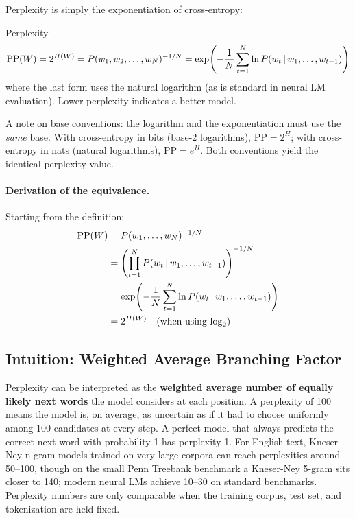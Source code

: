 Perplexity is simply the exponentiation of cross-entropy:

\begin{mathresult}{Perplexity}
\begin{equation}
\text{PP}(W) = 2^{H(W)}
= P(w_1, w_2, \ldots, w_N)^{-1/N}
= \exp\!\left(-\frac{1}{N}\sum_{t=1}^{N} \ln P(w_t \,|\, w_1, \ldots, w_{t-1})\right)
\label{eq:perplexity}
\end{equation}
where the last form uses the natural logarithm (as is standard in neural LM
evaluation).  Lower perplexity indicates a better model.

A note on base conventions: the logarithm and the exponentiation must use the
\emph{same} base.  With cross-entropy in bits (base-2 logarithms),
$\text{PP} = 2^{H}$; with cross-entropy in nats (natural logarithms),
$\text{PP} = e^{H}$.  Both conventions yield the identical perplexity value.
\end{mathresult}

\paragraph{Derivation of the equivalence.}
Starting from the definition:
\begin{align*}
\text{PP}(W) &= P(w_1, \ldots, w_N)^{-1/N} \\
&= \left(\prod_{t=1}^{N} P(w_t \,|\, w_1, \ldots, w_{t-1})\right)^{-1/N} \\
&= \exp\!\left(-\frac{1}{N}\sum_{t=1}^{N} \ln P(w_t \,|\, w_1, \ldots, w_{t-1})\right) \\
&= 2^{H(W)} \quad\text{(when using $\log_2$)}
\end{align*}

\subsection{Intuition: Weighted Average Branching Factor}

\begin{keyinsight}
Perplexity can be interpreted as the \textbf{weighted average number of
equally likely next words} the model considers at each position.  A perplexity
of 100 means the model is, on average, as uncertain as if it had to choose
uniformly among 100 candidates at every step.  A perfect model that always
predicts the correct next word with probability 1 has perplexity 1.  For
English text, Kneser-Ney n-gram models trained on very large corpora can reach
perplexities around 50--100, though on the small Penn Treebank benchmark a
Kneser-Ney 5-gram sits closer to 140; modern neural LMs achieve 10--30 on
standard benchmarks.  Perplexity numbers are only comparable when the training
corpus, test set, and tokenization are held fixed.
\end{keyinsight}

